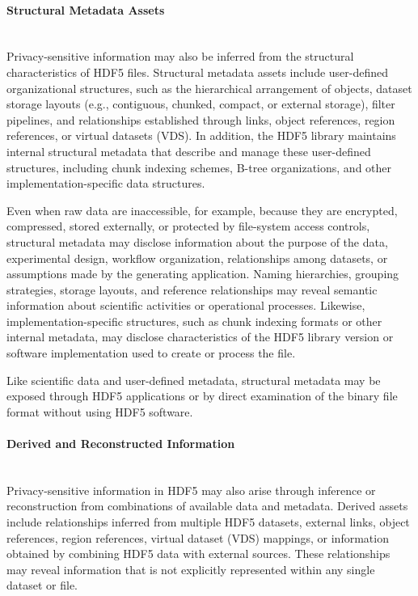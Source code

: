 \documentclass[../main.tex]{subfiles}
\begin{document}
\paragraph{Structural Metadata Assets}\mbox{}\\
Privacy-sensitive information may also be inferred from the structural characteristics of HDF5 files. 
Structural metadata assets include user-defined organizational structures, such as 
the hierarchical arrangement of objects, dataset storage layouts (e.g., contiguous, chunked, 
compact, or external storage), filter pipelines, and relationships established through links, 
object references, region references, or virtual datasets (VDS). In addition, the HDF5 library 
maintains internal structural metadata that describe and manage these user-defined structures, 
including chunk indexing schemes, B-tree organizations, and other implementation-specific data structures.

Even when raw data are inaccessible, for example, because they are encrypted, compressed, 
stored externally, or protected by file-system access controls, structural metadata may 
disclose information about the purpose of the data, experimental design, workflow organization, 
relationships among datasets, or assumptions made by the generating application. 
Naming hierarchies, grouping strategies, storage layouts, and reference relationships may reveal 
semantic information about scientific activities or operational processes. Likewise, 
implementation-specific structures, such as chunk indexing formats or other internal metadata, 
may disclose characteristics of the HDF5 library version or software implementation 
used to create or process the file.

Like scientific data and user-defined metadata, structural metadata may be exposed through 
HDF5 applications or by direct examination of the binary file format without using HDF5 software.


\paragraph{Derived and Reconstructed Information}\mbox{}\\
Privacy-sensitive information in HDF5 may also arise through inference or reconstruction 
from combinations of available data and metadata. Derived assets include relationships 
inferred from multiple HDF5 datasets, external links, object references, 
region references, virtual dataset (VDS) mappings, or information obtained by 
combining HDF5 data with external sources. 
These relationships may reveal information that is not explicitly represented within any single dataset or file.
\end{document}
